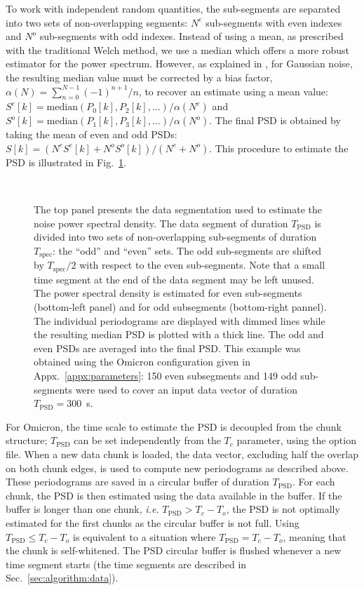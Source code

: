 To work with independent random quantities, the sub-segments are separated into two sets of non-overlapping segments: $N^e$ sub-segments with even indexes and $N^o$ sub-segments with odd indexes. Instead of using a mean, as prescribed with the traditional Welch method, we use a median which offers a more robust estimator for the power spectrum. However, as explained in \cite{Allen:2005fk}, for Gaussian noise, the resulting median value must be corrected by a bias factor, $\alpha(N)=\sum_{n=0}^{N-1}{(-1)^{n+1}/n}$, to recover an estimate using a mean value: $S^e[k]=\mathrm{median}(P_0[k], P_2[k],...)/\alpha(N^e)$ and $S^o[k]=\mathrm{median}(P_1[k], P_3[k],...)/\alpha(N^o)$. The final PSD is obtained by taking the mean of even and odd PSDs: $S[k]=(N^eS^e[k]+N^oS^o[k])/(N^e+N^o)$. This procedure to estimate the PSD is illustrated in Fig.~\ref{fig:psdseg}.
\begin{figure}
  \center
   \\
  \caption{The top panel presents the data segmentation used to estimate the noise power spectral density. The data segment of duration $T_\mathrm{PSD}$ is divided into two sets of non-overlapping sub-segments of duration $T_\mathrm{spec}$: the ``odd'' and ``even'' sets. The odd sub-segments are shifted by $T_\mathrm{spec}/2$ with respect to the even sub-segments. Note that a small time segment at the end of the data segment may be left unused. The power spectral density is estimated for even sub-segments (bottom-left panel) and for odd subsegments (bottom-right pannel). The individual periodograms are displayed with dimmed lines while the resulting median PSD is plotted with a thick line. The odd and even PSDs are averaged into the final PSD. This example was obtained using the Omicron configuration given in Appx.~\ref{appx:parameters}: 150 even subsegments and 149 odd sub-segments were used to cover an input data vector of duration $T_\mathrm{PSD}=300$~s.}
  \label{fig:psdseg}
\end{figure}

For Omicron, the time scale to estimate the PSD is decoupled from the chunk structure; $T_\mathrm{PSD}$ can be set independently from the $T_c$ parameter, using the option file. When a new data chunk is loaded, the data vector, excluding half the overlap on both chunk edges, is used to compute new periodograms as described above. These periodograms are saved in a circular buffer of duration $T_\mathrm{PSD}$. For each chunk, the PSD is then estimated using the data available in the buffer. If the buffer is longer than one chunk, \textit{i.e.} $T_\mathrm{PSD} > T_c-T_o$, the PSD is not optimally estimated for the first chunks as the circular buffer is not full. Using $T_\mathrm{PSD} \le T_c-T_o$ is equivalent to a situation where $T_\mathrm{PSD} = T_c-T_o$, meaning that the chunk is self-whitened. The PSD circular buffer is flushed whenever a new time segment starts (the time segments are described in Sec.~\ref{sec:algorithm:data}). 

